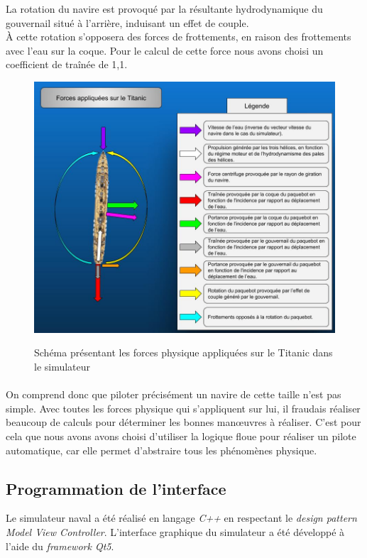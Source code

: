\documentclass[a4paper,11pt]{article}
\begin{document}
    \vspace*{0.3cm}
    La rotation du navire est provoqué par la résultante hydrodynamique du gouvernail situé à l’arrière, induisant un effet de couple.\\
    À cette rotation s’opposera des forces de frottements, en raison des frottements avec l'eau sur la coque. Pour le calcul de cette force nous avons choisi un coefficient de traînée de 1,1.

    \begin{figure}[H]
        \begin{center}
            \caption{Schéma présentant les forces physique appliquées sur le Titanic dans le simulateur}
            \includegraphics[scale=0.56]{assets/Isaac_vs_Titanic.jpg}
            \label{fig:titanicForces}
        \end{center}
    \end{figure}
    \paragraph{}
    On comprend donc que piloter précisément un navire de cette taille n'est pas simple. Avec toutes les forces physique qui s'appliquent sur lui, il fraudais réaliser beaucoup de calculs pour déterminer les bonnes manœuvres à réaliser. C'est pour cela que nous avons avons choisi d'utiliser la logique floue pour réaliser un pilote automatique, car elle permet d’abstraire tous les phénomènes physique.

    \subsection{Programmation de l'interface}
    Le simulateur naval a été réalisé en langage \textit{C++} en respectant le \textit{design pattern Model View Controller}. L'interface graphique du simulateur a été développé à l'aide du \textit{framework Qt5}.
\end{document}
